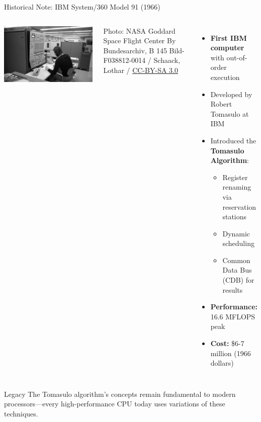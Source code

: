 \documentclass[aspectratio=169,12pt]{beamer}
\begin{document}
\begin{frame}{Historical Note: IBM System/360 Model 91 (1966)}
    \begin{columns}
        \includegraphics[width=\textwidth]{figures/ibm360m91.jpg}
        
        \vspace{0.2cm}
        \scriptsize Photo: NASA Goddard Space Flight Center
        {
            \fontsize{4}{5}\selectfont
            By Bundesarchiv, B 145 Bild-F038812-0014 / Schaack, Lothar / 
            \href{https://commons.wikimedia.org/w/index.php?curid=5455799}{CC-BY-SA 3.0}
        }
        
        \begin{itemize}
            \item \textbf{First IBM computer} with out-of-order execution
            \item Developed by Robert Tomasulo at IBM
            \item Introduced the \textbf{Tomasulo Algorithm}:
            \begin{itemize}
                \footnotesize
                \item Register renaming via reservation stations
                \item Dynamic scheduling
                \item Common Data Bus (CDB) for results
            \end{itemize}
            \item \textbf{Performance:} 16.6 MFLOPS peak
            \item \textbf{Cost:} \$6-7 million (1966 dollars)
        \end{itemize}
    \end{columns}
    
    \vspace{0.3cm}
    \begin{alertblock}{Legacy}
        The Tomasulo algorithm's concepts remain fundamental to modern processors—every high-performance CPU today uses variations of these techniques.
    \end{alertblock}
\end{frame}
\end{document}
